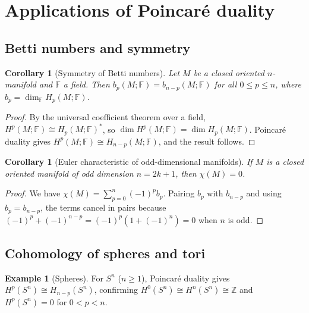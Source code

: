 \documentclass[12pt,a4paper,openany]{book}
\theoremstyle{definition}
\newtheorem{example}[definition]{Example}
\theoremstyle{plain}
\newtheorem{corollary}[definition]{Corollary}
\theoremstyle{remark}
\newcommand{\Z}{\mathbb{Z}}
\newcommand{\F}{\mathbb{F}}
\begin{document}
\section{Applications of Poincar\'e duality}\label{sec:pd-applications}

\subsection{Betti numbers and symmetry}

\begin{corollary}[Symmetry of Betti numbers]
\label{cor:betti-symmetry}
Let $M$ be a closed oriented $n$-manifold and $\F$ a field.  Then
$b_p(M;\F) = b_{n-p}(M;\F)$ for all $0\le p\le n$, where
$b_p = \dim_{\F} H_p(M;\F)$.
\end{corollary}

\begin{proof}
By the universal coefficient theorem over a field,
$H^p(M;\F)\cong H_p(M;\F)^*$, so
$\dim H^p(M;\F)=\dim H_p(M;\F)$.  Poincar\'e duality gives
$H^p(M;\F)\cong H_{n-p}(M;\F)$, and the result follows.
\end{proof}

\begin{corollary}[Euler characteristic of odd-dimensional manifolds]
\label{cor:euler-odd}
If $M$ is a closed oriented manifold of odd dimension $n=2k+1$, then
$\chi(M)=0$.
\end{corollary}

\begin{proof}
We have $\chi(M)=\sum_{p=0}^n(-1)^p b_p$.  Pairing $b_p$ with
$b_{n-p}$ and using $b_p=b_{n-p}$, the terms cancel in pairs because
$(-1)^p+(-1)^{n-p}=(-1)^p(1+(-1)^n)=0$ when $n$ is odd.
\end{proof}

\subsection{Cohomology of spheres and tori}

\begin{example}[Spheres]
For $S^n$ ($n\ge1$), Poincar\'e duality gives $H^p(S^n)\cong
H_{n-p}(S^n)$, confirming $H^0(S^n)\cong H^n(S^n)\cong\Z$ and
$H^p(S^n)=0$ for $0<p<n$.
\end{example}
\end{document}
